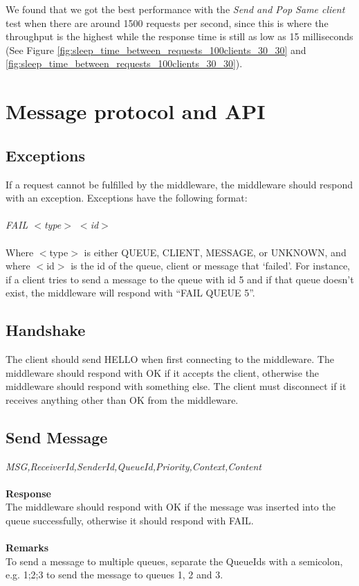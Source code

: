 \documentclass{article}
\begin{document}
        We found that we got the best performance with the \textit{Send and Pop Same client} test when there are around 1500 requests per second, since this is where the throughput is the highest while the response time is still as low as 15 milliseconds (See Figure \ref{fig:sleep_time_between_requests_100clients_30_30} and \ref{fig:sleep_time_between_requests_100clients_30_30}).
    \clearpage
    \appendix
        \section{Message protocol and API}
        \label{sec:message_protocol_api}
            \subsection{Exceptions}
                If a request cannot be fulfilled by the middleware, the middleware should respond with an exception.  Exceptions have the following format:\\
                \\
                \indent\textit{FAIL $<$type$>$ $<$id$>$}\\
                \\
                Where $<$type$>$ is either QUEUE, CLIENT, MESSAGE, or UNKNOWN, and where $<$id$>$ is the id of the queue, client or message that ‘failed’. For instance, if a client tries to send a message to the queue with id 5 and if that queue doesn't exist, the middleware will respond with “FAIL QUEUE 5”.

            \subsection{Handshake}
                The client should send HELLO when first connecting to the middleware. The middleware should respond with OK if it accepts the client, otherwise the middleware should respond with something else. The client must disconnect if it receives anything other than OK from the middleware.


            \subsection{Send Message}
                \indent\indent\textit{MSG,ReceiverId,SenderId,QueueId,Priority,Context,Content}\\
                \\
                \textbf{Response}\\
                The middleware should respond with OK if the message was inserted into the queue successfully, otherwise it should respond with FAIL.\\
                \\
                \textbf{Remarks}\\
                To send a message to multiple queues, separate the QueueIds with a semicolon, e.g. 1;2;3 to send the message to queues 1, 2 and 3.
\end{document}
